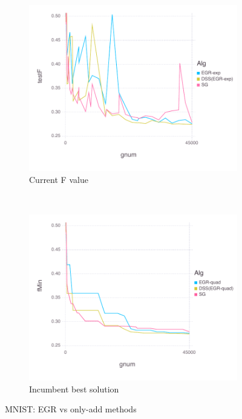 \documentclass[11pt]{article}
\begin{document}
   \begin{figure}[H]
       \centering
       \begin{subfigure}[b]{0.45\textwidth}
           \includegraphics[width=\textwidth]{Figures/MNISTBLtrueFfFinal-dss.pdf}
           \caption{Current F value}
       \end{subfigure}
       ~ %
         \begin{subfigure}[b]{0.45\textwidth}
             \includegraphics[width=\textwidth]{Figures/MNISTBLtrueFminfFinal-dss.pdf}
             \caption{Incumbent best solution}
         \end{subfigure}
       \caption{MNIST: EGR vs only-add methods}\label{fig:MNISToa}
   \end{figure}
   
\end{document}

